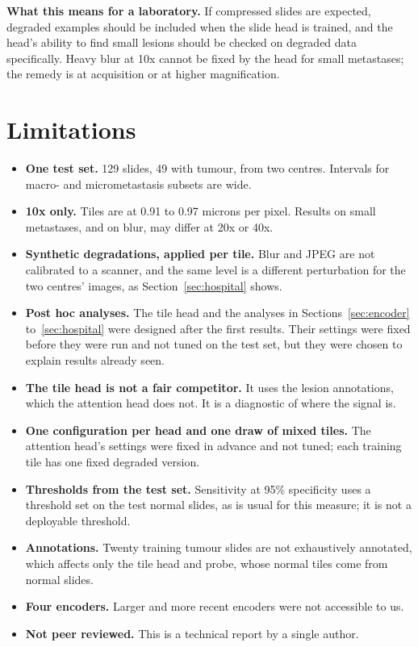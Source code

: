 \documentclass[11pt,a4paper]{article}
\begin{document}
\textbf{What this means for a laboratory.} If compressed slides are expected, degraded examples should be included when the slide head is trained, and the head's ability to find small lesions should be checked on degraded data specifically. Heavy blur at 10x cannot be fixed by the head for small metastases; the remedy is at acquisition or at higher magnification.

\section{Limitations}

\begin{itemize}
\item \textbf{One test set.} 129 slides, 49 with tumour, from two centres. Intervals for macro- and micrometastasis subsets are wide.
\item \textbf{10x only.} Tiles are at 0.91 to 0.97 microns per pixel. Results on small metastases, and on blur, may differ at 20x or 40x.
\item \textbf{Synthetic degradations, applied per tile.} Blur and JPEG are not calibrated to a scanner, and the same level is a different perturbation for the two centres' images, as Section~\ref{sec:hospital} shows.
\item \textbf{Post hoc analyses.} The tile head and the analyses in Sections~\ref{sec:encoder} to~\ref{sec:hospital} were designed after the first results. Their settings were fixed before they were run and not tuned on the test set, but they were chosen to explain results already seen.
\item \textbf{The tile head is not a fair competitor.} It uses the lesion annotations, which the attention head does not. It is a diagnostic of where the signal is.
\item \textbf{One configuration per head and one draw of mixed tiles.} The attention head's settings were fixed in advance and not tuned; each training tile has one fixed degraded version.
\item \textbf{Thresholds from the test set.} Sensitivity at 95\% specificity uses a threshold set on the test normal slides, as is usual for this measure; it is not a deployable threshold.
\item \textbf{Annotations.} Twenty training tumour slides are not exhaustively annotated, which affects only the tile head and probe, whose normal tiles come from normal slides.
\item \textbf{Four encoders.} Larger and more recent encoders were not accessible to us.
\item \textbf{Not peer reviewed.} This is a technical report by a single author.
\end{itemize}
\end{document}
